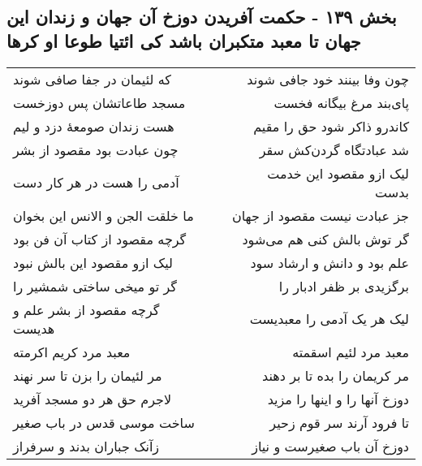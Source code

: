 \begin{center}
\section*{بخش ۱۳۹ - حکمت آفریدن دوزخ آن جهان و زندان این جهان تا معبد متکبران باشد کی ائتیا طوعا او کرها}
\label{sec:sh139}
\begin{longtable}{l p{0.5cm} r}
که لئیمان در جفا صافی شوند
&&
چون وفا بینند خود جافی شوند
\\
مسجد طاعاتشان پس دوزخست
&&
پای‌بند مرغ بیگانه فخست
\\
هست زندان صومعهٔ دزد و لیم
&&
کاندرو ذاکر شود حق را مقیم
\\
چون عبادت بود مقصود از بشر
&&
شد عبادتگاه گردن‌کش سقر
\\
آدمی را هست در هر کار دست
&&
لیک ازو مقصود این خدمت بدست
\\
ما خلقت الجن و الانس این بخوان
&&
جز عبادت نیست مقصود از جهان
\\
گرچه مقصود از کتاب آن فن بود
&&
گر توش بالش کنی هم می‌شود
\\
لیک ازو مقصود این بالش نبود
&&
علم بود و دانش و ارشاد سود
\\
گر تو میخی ساختی شمشیر را
&&
برگزیدی بر ظفر ادبار را
\\
گرچه مقصود از بشر علم و هدیست
&&
لیک هر یک آدمی را معبدیست
\\
معبد مرد کریم اکرمته
&&
معبد مرد لئیم اسقمته
\\
مر لئیمان را بزن تا سر نهند
&&
مر کریمان را بده تا بر دهند
\\
لاجرم حق هر دو مسجد آفرید
&&
دوزخ آنها را و اینها را مزید
\\
ساخت موسی قدس در باب صغیر
&&
تا فرود آرند سر قوم زحیر
\\
زآنک جباران بدند و سرفراز
&&
دوزخ آن باب صغیرست و نیاز
\\
\end{longtable}
\end{center}
